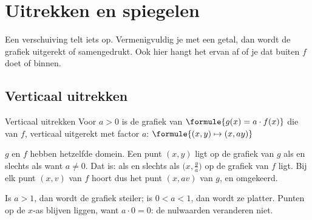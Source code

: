 
\begin{oefeningen}

\end{oefeningen}

\section{Uitrekken en spiegelen}

Een verschuiving telt iets op. Vermenigvuldig je met een getal, dan wordt de grafiek uitgerekt of samengedrukt. Ook hier hangt het ervan af of je dat buiten $f$ doet of binnen.

\subsection{Verticaal uitrekken}

\begin{theorie}
\begin{stelling}{Verticaal uitrekken}
Voor $a > 0$ is de grafiek van $\formule{g(x) = a \cdot f(x)}$ die van $f$, verticaal uitgerekt met factor $a$: \quad $\formule{(x, y) \mapsto (x, ay)}$
\end{stelling}

\begin{bewijs}
$g$ en $f$ hebben hetzelfde domein. Een punt $(x, y)$ ligt op de grafiek van $g$ als en slechts als
want $a \neq 0$. Dat is: als en slechts als $\bigl(x, \frac{y}{a}\bigr)$ op de grafiek van $f$ ligt. Bij elk punt $(x, v)$ van $f$ hoort dus het punt $(x, av)$ van $g$, en omgekeerd.
\end{bewijs}
\end{theorie}

Is $a > 1$, dan wordt de grafiek steiler; is $0 < a < 1$, dan wordt ze platter. Punten op de $x$-as blijven liggen, want $a \cdot 0 = 0$: de nulwaarden veranderen niet.


